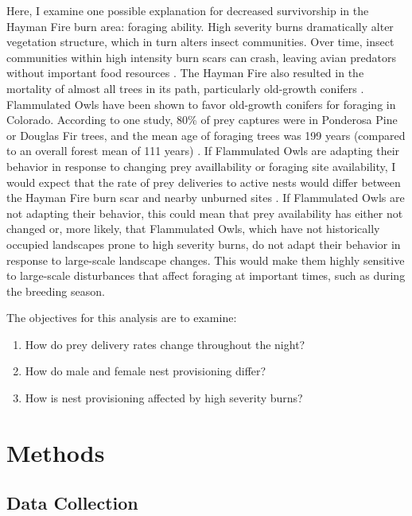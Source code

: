 \documentclass[]{article}
\providecommand{\tightlist}{%
  \setlength{\itemsep}{0pt}\setlength{\parskip}{0pt}}
\begin{document}
Here, I examine one possible explanation for decreased survivorship in
the Hayman Fire burn area: foraging ability. High severity burns
dramatically alter vegetation structure, which in turn alters insect
communities. Over time, insect communities within high intensity burn
scars can crash, leaving avian predators without important food
resources \citep{nappi2010effect}. The Hayman Fire also resulted in the
mortality of almost all trees in its path, particularly old-growth
conifers \citep{fornwalt2016did}. Flammulated Owls have been shown to
favor old-growth conifers for foraging in Colorado. According to one
study, 80\% of prey captures were in Ponderosa Pine or Douglas Fir
trees, and the mean age of foraging trees was 199 years (compared to an
overall forest mean of 111 years) \citep{reynolds1992flammulated}. If
Flammulated Owls are adapting their behavior in response to changing
prey availlability or foraging site availability, I would expect that
the rate of prey deliveries to active nests would differ between the
Hayman Fire burn scar and nearby unburned sites
\citep{zarybnicka2009tengmalm}. If Flammulated Owls are not adapting
their behavior, this could mean that prey availability has either not
changed or, more likely, that Flammulated Owls, which have not
historically occupied landscapes prone to high severity burns, do not
adapt their behavior in response to large-scale landscape changes. This
would make them highly sensitive to large-scale disturbances that affect
foraging at important times, such as during the breeding season.

The objectives for this analysis are to examine:

\begin{enumerate}
\def\labelenumi{\arabic{enumi}.}
\tightlist
\item
  How do prey delivery rates change throughout the night?
\item
  How do male and female nest provisioning differ?
\item
  How is nest provisioning affected by high severity burns?
\end{enumerate}

\hypertarget{methods}{%
\section{Methods}\label{methods}}

\hypertarget{data-collection}{%
\subsection{Data Collection}\label{data-collection}}
\end{document}
